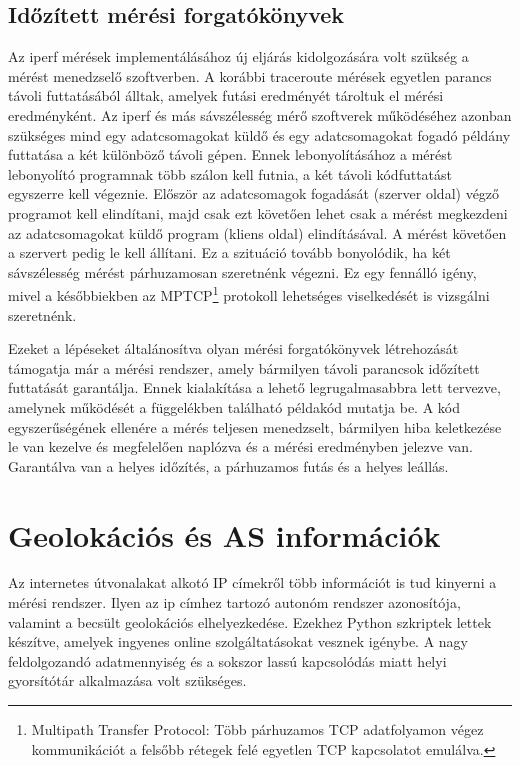 \subsection{Időzített mérési forgatókönyvek}
Az iperf mérések implementálásához új eljárás kidolgozására volt szükség a mérést menedzselő szoftverben. A korábbi traceroute mérések egyetlen parancs távoli futtatásából álltak, amelyek futási eredményét tároltuk el mérési eredményként. Az iperf és más sávszélesség mérő szoftverek működéséhez azonban szükséges mind egy adatcsomagokat küldő és egy adatcsomagokat fogadó példány futtatása a két különböző távoli gépen. Ennek lebonyolításához a mérést lebonyolító programnak több szálon kell futnia, a két távoli kódfuttatást egyszerre kell végeznie. Először az adatcsomagok fogadását (szerver oldal) végző programot kell elindítani, majd csak ezt követően lehet csak a mérést megkezdeni az adatcsomagokat küldő program (kliens oldal) elindításával. A mérést követően a szervert pedig le kell állítani. Ez a szituáció tovább bonyolódik, ha két sávszélesség mérést párhuzamosan szeretnénk végezni. Ez egy fennálló igény, mivel a későbbiekben az MPTCP\footnote{Multipath Transfer Protocol: Több párhuzamos TCP adatfolyamon végez kommunikációt a felsőbb rétegek felé egyetlen TCP kapcsolatot emulálva.} protokoll lehetséges viselkedését is vizsgálni szeretnénk.

Ezeket a lépéseket általánosítva olyan mérési forgatókönyvek létrehozását támogatja már a mérési rendszer, amely bármilyen távoli parancsok időzített futtatását garantálja. Ennek kialakítása a lehető legrugalmasabbra lett tervezve, amelynek működését a függelékben található példakód mutatja be. A kód egyszerűségének ellenére a mérés teljesen menedzselt, bármilyen hiba keletkezése le van kezelve és megfelelően naplózva és a mérési eredményben jelezve van. Garantálva van a helyes időzítés, a párhuzamos futás és a helyes leállás.



\section{Geolokációs és AS információk}
Az internetes útvonalakat alkotó IP címekről több információt is tud kinyerni a mérési rendszer. Ilyen az ip címhez tartozó autonóm rendszer azonosítója, valamint a becsült geolokációs elhelyezkedése. Ezekhez Python szkriptek lettek készítve, amelyek ingyenes online szolgáltatásokat vesznek igénybe. A nagy feldolgozandó adatmennyiség és a sokszor lassú kapcsolódás miatt helyi gyorsítótár alkalmazása volt szükséges.
